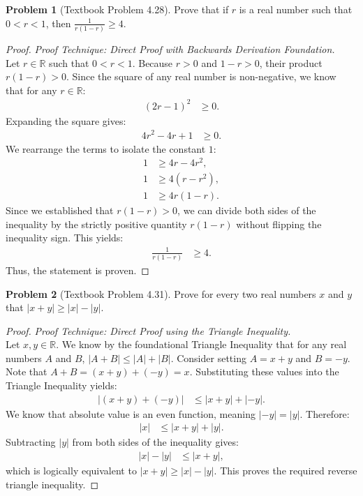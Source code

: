 \documentclass[11pt]{article}
\theoremstyle{definition}
\newtheorem{problem}{Problem}
\theoremstyle{remark}
\begin{document}
\begin{itemize}
\begin{problem}[Textbook Problem 4.28]
Prove that if $r$ is a real number such that $0 < r < 1$, then $\frac{1}{r(1-r)} \ge 4$.
\end{problem}
\begin{proof}
\textit{Proof Technique: Direct Proof with Backwards Derivation Foundation.} \\
Let $r \in \mathbb{R}$ such that $0 < r < 1$. Because $r > 0$ and $1 - r > 0$, their product $r(1 - r) > 0$. 
Since the square of any real number is non-negative, we know that for any $r \in \mathbb{R}$:
\begin{align*}
    (2r - 1)^2 &\ge 0.
\end{align*}
Expanding the square gives:
\begin{align*}
    4r^2 - 4r + 1 &\ge 0.
\end{align*}
We rearrange the terms to isolate the constant $1$:
\begin{align*}
    1 &\ge 4r - 4r^2, \\
    1 &\ge 4(r - r^2), \\
    1 &\ge 4r(1 - r).
\end{align*}
Since we established that $r(1 - r) > 0$, we can divide both sides of the inequality by the strictly positive quantity $r(1 - r)$ without flipping the inequality sign. This yields:
\begin{align*}
    \frac{1}{r(1 - r)} &\ge 4.
\end{align*}
Thus, the statement is proven.
\end{proof}

\begin{problem}[Textbook Problem 4.31]
Prove for every two real numbers $x$ and $y$ that $|x + y| \ge |x| - |y|$.
\end{problem}
\begin{proof}
\textit{Proof Technique: Direct Proof using the Triangle Inequality.} \\
Let $x, y \in \mathbb{R}$. We know by the foundational Triangle Inequality that for any real numbers $A$ and $B$, $|A + B| \le |A| + |B|$. 
Consider setting $A = x + y$ and $B = -y$. Note that $A + B = (x + y) + (-y) = x$.
Substituting these values into the Triangle Inequality yields:
\begin{align*}
    | (x + y) + (-y) | &\le |x + y| + |-y|.
\end{align*}
We know that absolute value is an even function, meaning $|-y| = |y|$. Therefore:
\begin{align*}
    |x| &\le |x + y| + |y|.
\end{align*}
Subtracting $|y|$ from both sides of the inequality gives:
\begin{align*}
    |x| - |y| &\le |x + y|,
\end{align*}
which is logically equivalent to $|x + y| \ge |x| - |y|$. This proves the required reverse triangle inequality.
\end{proof}


\end{itemize}
\end{document}

